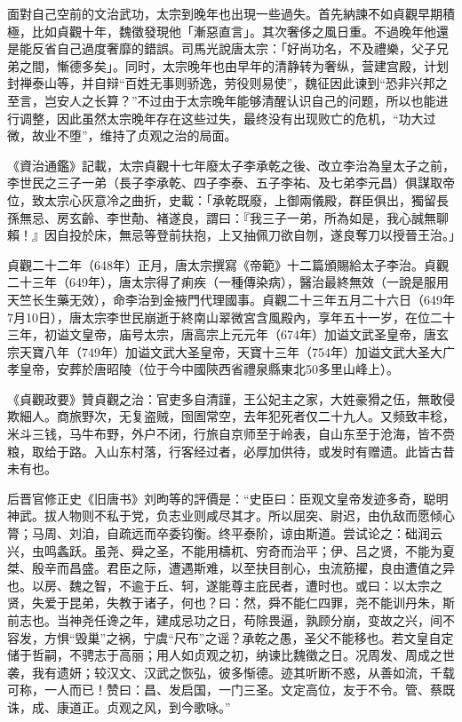 面對自己空前的文治武功，太宗到晚年也出現一些過失。首先納諫不如貞觀早期積極，比如貞觀十年，魏徵發現他「漸惡直言」。其次奢侈之風日重。不過晚年他還是能反省自己過度奢靡的錯誤。司馬光說唐太宗：「好尚功名，不及禮樂，父子兄弟之間，慚德多矣」。同时，太宗晚年也由早年的清静转为奢纵，营建宫殿，计划封禅泰山等，并自辩“百姓无事则骄逸，劳役则易使”，魏征因此谏到“恐非兴邦之至言，岂安人之长算？”不过由于太宗晚年能够清醒认识自己的问题，所以也能进行调整，因此虽然太宗晚年存在这些过失，最终没有出现败亡的危机，“功大过微，故业不堕”，维持了贞观之治的局面。

《資治通鑑》記載，太宗貞觀十七年廢太子李承乾之後、改立李治為皇太子之前，李世民之三子一弟（長子李承乾、四子李泰、五子李祐、及七弟李元昌）俱謀取帝位，致太宗心灰意冷之曲折，史載：「承乾既廢，上御兩儀殿，群臣俱出，獨留長孫無忌、房玄齡、李世勣、褚遂良，謂曰：『我三子一弟，所為如是，我心誠無聊賴！』因自投於床，無忌等登前扶抱，上又抽佩刀欲自刎，遂良奪刀以授晉王治。」

貞觀二十二年（648年）正月，唐太宗撰寫《帝範》十二篇頒賜給太子李治。貞觀二十三年（649年），唐太宗得了痢疾（一種傳染病），醫治最終無效（一說是服用天竺长生藥无效），命李治到金掖門代理國事。貞觀二十三年五月二十六日（649年7月10日），唐太宗李世民崩逝于終南山翠微宮含風殿內，享年五十一岁，在位二十三年，初谥文皇帝，庙号太宗，唐高宗上元元年（674年）加谥文武圣皇帝，唐玄宗天寶八年（749年）加谥文武大圣皇帝，天寶十三年（754年）加谥文武大圣大广孝皇帝，安葬於唐昭陵（位于今中國陝西省禮泉縣東北50多里山峰上）。

《貞觀政要》贊貞觀之治：官吏多自清謹，王公妃主之家，大姓豪猾之伍，無敢侵欺細人。商旅野次，无复盗贼，囹圄常空，去年犯死者仅二十九人。又频致丰稔，米斗三钱，马牛布野，外户不闭，行旅自京师至于岭表，自山东至于沧海，皆不赍粮，取给于路。入山东村落，行客经过者，必厚加供待，或发时有赠遗。此皆古昔未有也。

后晋官修正史《旧唐书》刘昫等的評價是：“史臣曰：臣观文皇帝发迹多奇，聪明神武。拔人物则不私于党，负志业则咸尽其才。所以屈突、尉迟，由仇敌而愿倾心膂；马周、刘洎，自疏远而卒委钧衡。终平泰阶，谅由斯道。尝试论之：础润云兴，虫鸣螽跃。虽尧、舜之圣，不能用檮杌、穷奇而治平；伊、吕之贤，不能为夏桀、殷辛而昌盛。君臣之际，遭遇斯难，以至抉目剖心，虫流筋擢，良由遭值之异也。以房、魏之智，不逾于丘、轲，遂能尊主庇民者，遭时也。或曰：以太宗之贤，失爱于昆弟，失教于诸子，何也？曰：然，舜不能仁四罪，尧不能训丹朱，斯前志也。当神尧任谗之年，建成忌功之日，苟除畏逼，孰顾分崩，变故之兴，间不容发，方惧“毁巢”之祸，宁虞“尺布”之谣？承乾之愚，圣父不能移也。若文皇自定储于哲嗣，不骋志于高丽；用人如贞观之初，纳谏比魏徵之日。况周发、周成之世袭，我有遗妍；较汉文、汉武之恢弘，彼多惭德。迹其听断不惑，从善如流，千载可称，一人而已！赞曰：昌、发启国，一门三圣。文定高位，友于不令。管、蔡既诛，成、康道正。贞观之风，到今歌咏。”

